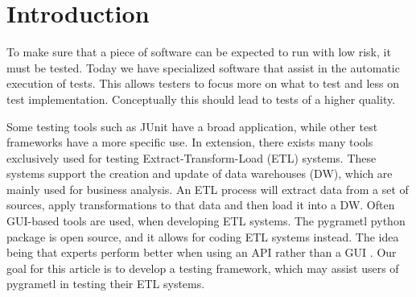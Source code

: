 \section*{Introduction} %

To make sure that a piece of software can be expected to run with low risk, it must be tested. Today we have specialized software that assist in the automatic execution of tests. This allows testers to focus more on what to test and less on test implementation. Conceptually this should lead to tests of a higher quality.

Some testing tools such as JUnit have a  broad application, while other test frameworks have a more specific use. In extension, there exists many tools exclusively used for testing  Extract-Transform-Load (ETL) systems. These systems support the creation and update of data warehouses (DW), which are mainly used for business analysis. An ETL process will extract data from a set of sources, apply transformations to that data and then load it into a DW. Often GUI-based tools are used, when developing ETL systems. The pygrametl python package is open source, and it allows for coding ETL systems instead. The idea being that experts perform better when using an API rather than a GUI \cite{thomsen2009pygrametl}. Our goal for this article is to develop a testing framework, which may assist users of pygrametl in testing their ETL systems. 


